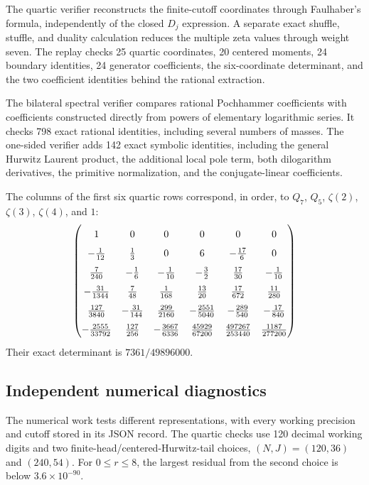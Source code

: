 \documentclass[11pt,a4paper]{article}
\numberwithin{equation}{section}
\theoremstyle{plain}
\theoremstyle{definition}
\theoremstyle{remark}
\begin{document}
The quartic verifier reconstructs the finite-cutoff coordinates through
Faulhaber's formula, independently of the closed $D_j$ expression.
A separate exact shuffle, stuffle, and duality calculation reduces
the multiple zeta values through weight seven.  The replay checks
25 quartic coordinates, 20 centered moments, 24 boundary identities,
24 generator coefficients, the six-coordinate determinant, and the
two coefficient identities behind the rational extraction.

The bilateral spectral verifier compares rational Pochhammer
coefficients with coefficients constructed directly from powers of
elementary logarithmic series.  It checks 798 exact rational
identities, including several numbers of masses.  The one-sided
verifier adds 142 exact symbolic identities, including the general
Hurwitz Laurent product, the additional local pole term, both
dilogarithm derivatives, the primitive normalization, and the
conjugate-linear coefficients.

The columns of the first six quartic rows correspond, in order, to
$Q_7$, $Q_5$, $\zeta(2)$, $\zeta(3)$, $\zeta(4)$, and $1$:
\[
\begingroup\renewcommand{\arraystretch}{1.6}
\begin{pmatrix}
1&0&0&0&0&0\\
-\frac1{12}&\frac13&0&6&-\frac{17}{6}&0\\
\frac7{240}&-\frac16&-\frac1{10}&-\frac32&\frac{17}{30}&-\frac1{10}\\
-\frac{31}{1344}&\frac7{48}&\frac1{168}&\frac{13}{20}&\frac{17}{672}&\frac{11}{280}\\
\frac{127}{3840}&-\frac{31}{144}&\frac{299}{2160}&-\frac{2551}{5040}&-\frac{289}{540}&-\frac{17}{840}\\
-\frac{2555}{33792}&\frac{127}{256}&-\frac{3667}{6336}&\frac{45929}{67200}&\frac{497267}{253440}&\frac{1187}{277200}
\end{pmatrix}
\endgroup
\]
Their exact determinant is $7361/49896000$.

\subsection{Independent numerical diagnostics}

The numerical work tests different representations, with every working
precision and cutoff stored in its JSON record.  The quartic checks
use 120 decimal working digits and two finite-head/centered-Hurwitz-tail
choices, $(N,J)=(120,36)$ and $(240,54)$.  For $0\le r\le8$, the
largest residual from the second choice is below
$3.6\times10^{-90}$.
\end{document}
